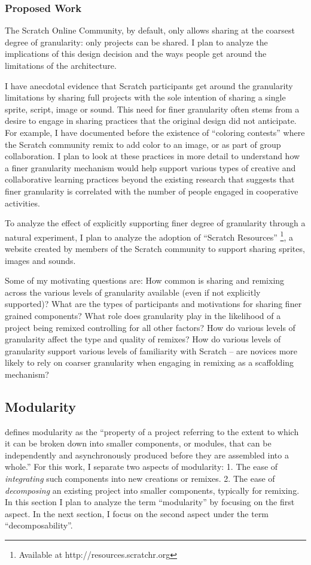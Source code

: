 \subsubsection{Proposed Work}
The Scratch Online Community, by default, only allows sharing at the coarsest degree of granularity: only projects can be shared. 
I plan to analyze the implications of this design decision and the ways  people get around the limitations of the architecture.

I have anecdotal evidence that Scratch participants get around the granularity limitations by sharing full projects with the sole intention of sharing a single sprite, script, image or sound.
This need for finer granularity often stems from a desire to engage in sharing practices that the original design did not anticipate. For example, I have documented before the existence of ``coloring contests'' \citep{nickerson_appropriation_2011} where the Scratch community remix to add color to an image, or as part of group collaboration.
I plan to look at these practices in more detail to understand how a finer granularity mechanism would help support various types of creative and collaborative learning practices beyond the existing research that suggests that finer granularity is correlated with the number of people engaged in cooperative activities.

To analyze the effect of explicitly supporting finer degree of granularity through a natural experiment, I plan to analyze the adoption of ``Scratch Resources'' \footnote{Available at http://resources.scratchr.org}, a website created by members of the Scratch community to support sharing sprites, images and sounds. 

Some of my motivating questions are: 
How common is sharing and remixing across the various levels of granularity available (even if not explicitly supported)?
What are the types of participants and motivations for sharing finer grained components?
What role does granularity play in the likelihood of a project being remixed controlling for all other factors?
How do various levels of granularity affect the type and quality of remixes?
How do various levels of granularity support various levels of familiarity with Scratch -- are novices more likely to rely on coarser granularity when engaging in remixing as a scaffolding mechanism?

\subsection{Modularity}
\citet{benkler_coases_2002} defines modularity as the ``property of a project referring to the extent to which it can be broken down into smaller components, or modules, that can be independently and asynchronously produced before they are assembled into a whole.''
For this work, I separate two aspects of modularity:
1. The ease of \emph{integrating} such components into new creations or remixes.
2. The ease of \emph{decomposing} an existing project into smaller components, typically for remixing.
In this section I plan to analyze the term ``modularity'' by focusing on the first aspect.
In the next section, I focus on the second aspect under the term ``decomposability''.

